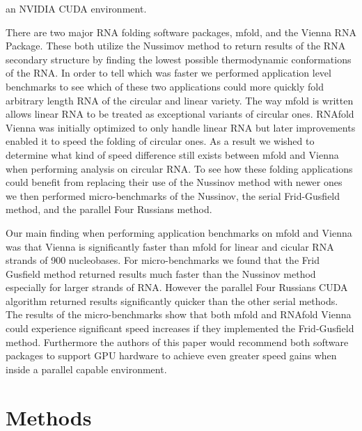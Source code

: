 \documentclass[12pt]{article}
\begin{document}
an NVIDIA CUDA environment\cite{balaji}.
\par There are two major RNA folding software packages, mfold\cite{zuker1989,zuker1981},
and the Vienna RNA Package\cite{vienna}. These both utilize the Nussimov method
to return results of the RNA secondary structure by finding the lowest possible
thermodynamic conformations of the RNA\cite{zuker1981,vienna}. In order to tell
which was faster we performed application level benchmarks\cite{eulogy} to see
which of these two applications could more quickly fold arbitrary length RNA of
the circular and linear variety. The way mfold is written allows linear RNA to
be treated as exceptional variants of circular ones\cite{circular}. RNAfold
Vienna was initially optimized to only handle linear RNA\cite{circular} but
later improvements enabled it to speed the folding of circular ones\cite{circular}.
As a result we wished to determine what kind of speed difference still exists
between mfold and Vienna when performing analysis on circular RNA. To see how
these folding applications could benefit from replacing their use of the Nussinov
method with newer ones we then performed micro-benchmarks\cite{sysperformance} of the Nussinov, the
serial Frid-Gusfield method, and the parallel Four Russians method.

\par Our main finding when performing application benchmarks on mfold and
Vienna was that Vienna is significantly faster than mfold for linear and cicular
RNA strands of 900 nucleobases. For micro-benchmarks we found that the Frid Gusfield method
returned results much faster than the Nussinov method especially for larger strands of RNA. However
the parallel Four Russians CUDA algorithm returned results significantly quicker than the other serial methods. The results of the micro-benchmarks show that both mfold and RNAfold Vienna could experience
significant speed increases if they implemented the Frid-Gusfield method. Furthermore
the authors of this paper would recommend both software packages to support GPU
hardware to achieve even greater speed gains when inside a parallel capable
environment.

\section{Methods}
\end{document}

